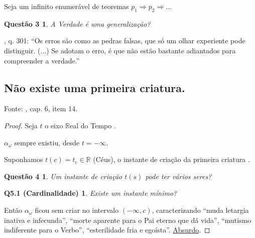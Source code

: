 \documentclass[12pt,a4paper]{article}
\begin{document}
Seja um infinito enumer\'avel de teoremas $p_1 \Rightarrow p_2 \Rightarrow ...$

			\newtheorem{Q3}{Quest\~ao 3}
			\begin{Q3} A Verdade \'e uma generaliza\c{c}\~ao?
			\end{Q3}

			\begin{flushright}
			\end{flushright}

\cite{lm}, q. 301: \textquotedblleft Os erros s\~ao como as pedras falsas, que s\'o um olhar
experiente pode distinguir. (...) Se adotam o erro, \'e que n\~ao est\~ao
bastante adiantados para compreender a verdade.\textquotedblright

		\subsection{N\~ao existe uma primeira criatura.}\label{firstCreature}
			\begin{flushright}
			\end{flushright}

			Fonte: \cite{genese}, cap. 6, item 14.

			\begin{proof}
				Seja $ t $ o eixo $ \mathbb{R} $eal do Tempo \cite{tempo}.

				$ \alpha_\omega $ sempre existiu, desde $ t = - \infty $\footnotemark[1].


				Suponhamos $ t(c) = t_c \in \mathbb{R} $ (C\'eus), o instante de cria\c{c}\~ao da primeira criatura \cite{criatura}.

				\newtheorem{Q4}{Quest\~ao 4}
				\begin{Q4} Um instante de cria\c{c}\~ao $t(s)$ pode ter v\'arios seres?
				\end{Q4}

				\newtheorem{Q5.1}{Q5.1 (Cardinalidade)}
				\begin{Q5.1} Existe um instante m\'inimo?
				\end{Q5.1}

				Ent\~ao $ \alpha_\omega $ ficou sem criar no intervalo $(-\infty, c)$, caracterizando \textquotedblleft muda letargia inativa e infecunda\textquotedblright, \textquotedblleft morte aparente para o Pai eterno que d\'a vida\textquotedblright, \textquotedblleft mutismo indiferente para o Verbo\textquotedblright, \textquotedblleft esterilidade fria e ego\'ista\textquotedblright. \href{http://en.wikipedia.org/wiki/Proof_by_contradiction}{Absurdo}.
			\end{proof}
\end{document}
